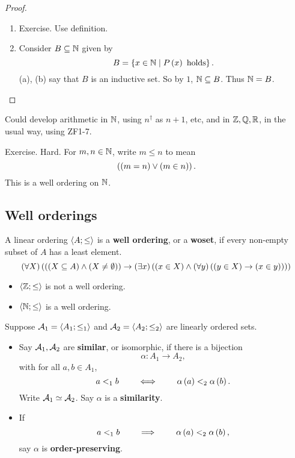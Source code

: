 \begin{proof}
\hfill
\begin{enumerate}
\item Exercise. Use definition.
\item Consider $ B \subseteq \N $ given by
$$ B = \cb{x \in \N \mid P\rb{x} \ \text{holds}}. $$
(a), (b) say that $ B $ is an inductive set. So by $ 1 $, $ \N \subseteq B $. Thus $ \N = B $.
\end{enumerate}
\end{proof}

Could develop arithmetic in $ \N $, using $ n^\dagger $ as $ n + 1 $, etc, and in $ \Z, \Q, \R $, in the usual way, using ZF1-7.

\begin{example2}
Exercise. Hard. For $ m, n \in \N $, write $ m \le n $ to mean
$$ \orb{\eqb{m}{n}}{\inb{m}{n}}. $$
This is a well ordering on $ \N $.
\end{example2}

\pagebreak

\subsection{Well orderings}

\begin{definition}
A linear ordering $ \ab{A; \le} $ is a \textbf{well ordering}, or a \textbf{woset}, if every non-empty subset of $ A $ has a least element.
$$ \fab{X}\impb{\andb{\subb{X}{A}}{\neb{X}{\emptyset}}}{\teb{x}\andb{\inb{x}{X}}{\fab{y}\impb{\inb{y}{X}}{\inb{x}{y}}}} $$
\end{definition}

\begin{example2}
\hfill
\begin{itemize}
\item $ \ab{\Z; \le} $ is not a well ordering.
\item $ \ab{\N; \le} $ is a well ordering.
\end{itemize}
\end{example2}


Suppose $ \AA_1 = \ab{A_1; \le_1} $ and $ \AA_2 = \ab{A_2; \le_2} $ are linearly ordered sets.

\begin{definition}
\hfill
\begin{itemize}
\item Say $ \AA_1, \AA_2 $ are \textbf{similar}, or isomorphic, if there is a bijection
$$ \alpha : A_1 \to A_2, $$
with for all $ a, b \in A_1 $,
$$ a <_1 b \qquad \iff \qquad \alpha\rb{a} <_2 \alpha\rb{b}. $$
Write $ \AA_1 \simeq \AA_2 $. Say $ \alpha $ is a \textbf{similarity}.
\item If
$$ a <_1 b \qquad \implies \qquad \alpha\rb{a} <_2 \alpha\rb{b}, $$
say $ \alpha $ is \textbf{order-preserving}.
\end{itemize}
\end{definition}

